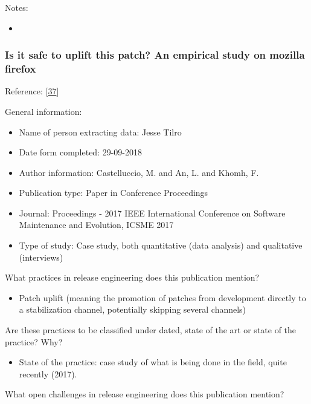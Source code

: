 \documentclass[]{book}
\providecommand{\tightlist}{%
  \setlength{\itemsep}{0pt}\setlength{\parskip}{0pt}}
\begin{document}
Notes:

\begin{itemize}
\item
\end{itemize}

\subsubsection{Is it safe to uplift this patch? An empirical study on
mozilla
firefox}\label{is-it-safe-to-uplift-this-patch-an-empirical-study-on-mozilla-firefox}

Reference: {[}\protect\hyperlink{ref-castelluccio2017a}{37}{]}

General information:

\begin{itemize}
\tightlist
\item
  Name of person extracting data: Jesse Tilro
\item
  Date form completed: 29-09-2018
\item
  Author information: Castelluccio, M. and An, L. and Khomh, F.
\item
  Publication type: Paper in Conference Proceedings
\item
  Journal: Proceedings - 2017 IEEE International Conference on Software
  Maintenance and Evolution, ICSME 2017
\item
  Type of study: Case study, both quantitative (data analysis) and
  qualitative (interviews)
\end{itemize}

What practices in release engineering does this publication mention?

\begin{itemize}
\tightlist
\item
  Patch uplift (meaning the promotion of patches from development
  directly to a stabilization channel, potentially skipping several
  channels)
\end{itemize}

Are these practices to be classified under dated, state of the art or
state of the practice? Why?

\begin{itemize}
\tightlist
\item
  State of the practice: case study of what is being done in the field,
  quite recently (2017).
\end{itemize}

What open challenges in release engineering does this publication
mention?
\end{document}
